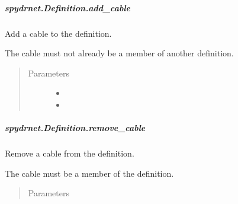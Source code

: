 \documentclass[letterpaper,10pt,english,openany,oneside]{sphinxmanual}
\begin{document}
\subparagraph{spydrnet.Definition.add\_cable}
\label{\detokenize{reference/classes/generated/spydrnet.Definition.add_cable:spydrnet-definition-add-cable}}\label{\detokenize{reference/classes/generated/spydrnet.Definition.add_cable::doc}}

\begin{fulllineitems}
\label{\detokenize{reference/classes/generated/spydrnet.Definition.add_cable:spydrnet.Definition.add_cable}}
Add a cable to the definition.

The cable must not already be a member of another definition.
\begin{quote}\begin{description}
\item[{Parameters}] \leavevmode\begin{itemize}
\item {} 

\item {} 

\end{itemize}

\end{description}\end{quote}

\end{fulllineitems}



\subparagraph{spydrnet.Definition.remove\_cable}
\label{\detokenize{reference/classes/generated/spydrnet.Definition.remove_cable:spydrnet-definition-remove-cable}}\label{\detokenize{reference/classes/generated/spydrnet.Definition.remove_cable::doc}}

\begin{fulllineitems}
\label{\detokenize{reference/classes/generated/spydrnet.Definition.remove_cable:spydrnet.Definition.remove_cable}}
Remove a cable from the definition.

The cable must be a member of the definition.
\begin{quote}\begin{description}
\item[{Parameters}] \leavevmode
{}

\end{description}\end{quote}

\end{fulllineitems}
\end{document}
